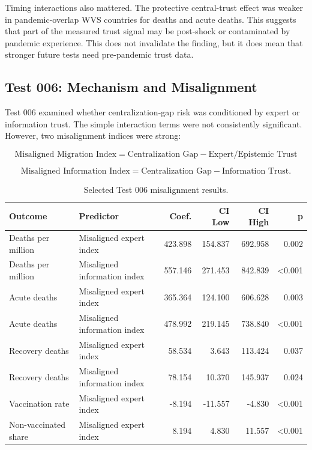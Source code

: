 \documentclass[12pt]{article}
\begin{document}
Timing interactions also mattered. The protective central-trust effect was weaker in pandemic-overlap WVS countries for deaths and acute deaths. This suggests that part of the measured trust signal may be post-shock or contaminated by pandemic experience. This does not invalidate the finding, but it does mean that stronger future tests need pre-pandemic trust data.

\subsection{Test 006: Mechanism and Misalignment}

Test 006 examined whether centralization-gap risk was conditioned by expert or information trust. The simple interaction terms were not consistently significant. However, two misalignment indices were strong:

\[
\text{Misaligned Migration Index} =
\text{Centralization Gap} -
\text{Expert/Epistemic Trust}
\]

\[
\text{Misaligned Information Index} =
\text{Centralization Gap} -
\text{Information Trust}.
\]

\begin{table}[htbp]
\centering
\small
\caption{Selected Test 006 misalignment results.}
\begin{tabular}{llrrrr}
\toprule
Outcome & Predictor & Coef. & CI Low & CI High & p \\
\midrule
Deaths per million & Misaligned expert index & 423.898 & 154.837 & 692.958 & 0.002 \\
Deaths per million & Misaligned information index & 557.146 & 271.453 & 842.839 & <0.001 \\
Acute deaths & Misaligned expert index & 365.364 & 124.100 & 606.628 & 0.003 \\
Acute deaths & Misaligned information index & 478.992 & 219.145 & 738.840 & <0.001 \\
Recovery deaths & Misaligned expert index & 58.534 & 3.643 & 113.424 & 0.037 \\
Recovery deaths & Misaligned information index & 78.154 & 10.370 & 145.937 & 0.024 \\
Vaccination rate & Misaligned expert index & -8.194 & -11.557 & -4.830 & <0.001 \\
Non-vaccinated share & Misaligned expert index & 8.194 & 4.830 & 11.557 & <0.001 \\
\bottomrule
\end{tabular}
\end{table}
\end{document}
